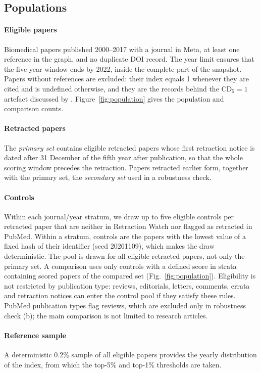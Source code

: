 \subsection{Populations}
\paragraph{Eligible papers} Biomedical papers published 2000--2017 with a journal in Meta, at least one reference in
the graph, and no duplicate DOI record. The year limit ensures that the five-year window ends by 2022, inside the
complete part of the snapshot. Papers without references are excluded: their index equals 1 whenever they are cited
and is undefined otherwise, and they are the records behind the CD$_5 = 1$ artefact discussed by
\citet{holst2024artefacts}. Figure~\ref{fig:population} gives the population and comparison counts.

\paragraph{Retracted papers} The \emph{primary set} contains eligible retracted papers whose first retraction notice
is dated after 31 December of the fifth year after publication, so that the whole scoring window precedes the
retraction. Papers retracted earlier form, together with the primary set, the \emph{secondary set} used in a robustness check.

\paragraph{Controls} Within each journal/year stratum, we draw up to five eligible controls per retracted paper that
are neither in Retraction Watch nor flagged as retracted in PubMed. Within a stratum, controls are the papers with the
lowest value of a fixed hash of their identifier (seed 20261109), which makes the draw deterministic.
The pool is drawn for all eligible retracted papers, not only the primary set. A comparison uses only controls
with a defined score in strata containing scored papers of the compared set (Fig.~\ref{fig:population}).
Eligibility is not restricted by publication type: reviews, editorials, letters, comments, errata and retraction
notices can enter the control pool if they satisfy these rules. PubMed publication types flag reviews, which are
excluded only in robustness check (b); the main comparison is not limited to research articles.

\paragraph{Reference sample} A deterministic 0.2\% sample of all eligible papers provides the
yearly distribution of the index, from which the top-5\% and top-1\% thresholds are taken.

